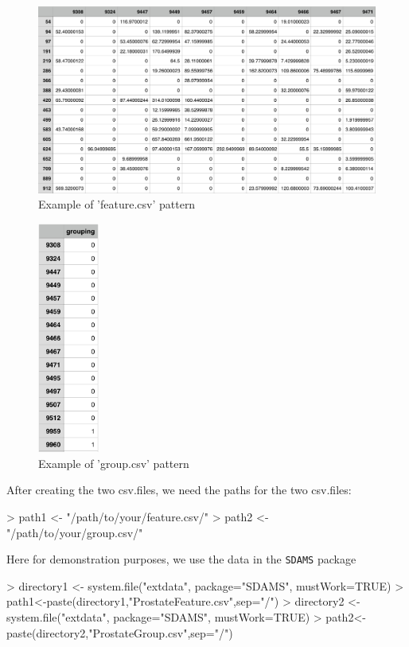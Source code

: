 \documentclass[12pt]{article}
\begin{document}
\begin{figure}[h!]
  \centering
  \includegraphics{feature.PNG}
  \caption{Example of 'feature.csv' pattern}
  \label{example feature}
\end{figure}
\begin{figure}[ht]
  \centering
  \includegraphics[width=2cm]{group.PNG}
  \caption{Example of 'group.csv' pattern}
  \label{example group}
\end{figure}


After creating the two csv.files, we need the paths for the two csv.files:

\begin{Schunk}
\begin{Sinput}
> path1 <- "/path/to/your/feature.csv/"
> path2 <- "/path/to/your/group.csv/"
\end{Sinput}
\end{Schunk}

Here for demonstration purposes, we use the data in the {\tt SDAMS} package

\begin{Schunk}
\begin{Sinput}
> directory1 <- system.file("extdata", package="SDAMS", mustWork=TRUE)
> path1<-paste(directory1,"ProstateFeature.csv",sep="/")
> directory2 <- system.file("extdata", package="SDAMS", mustWork=TRUE)
> path2<-paste(directory2,"ProstateGroup.csv",sep="/")
\end{Sinput}
\end{Schunk}
\end{document}
